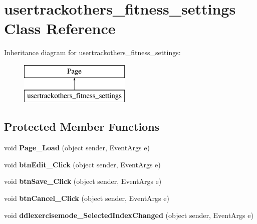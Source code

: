\hypertarget{classusertrackothers__fitness__settings}{\section{usertrackothers\-\_\-fitness\-\_\-settings Class Reference}
\label{classusertrackothers__fitness__settings}
}
Inheritance diagram for usertrackothers\-\_\-fitness\-\_\-settings\-:\begin{figure}[H]
\begin{center}
\leavevmode
\includegraphics[height=2.000000cm]{classusertrackothers__fitness__settings}
\end{center}
\end{figure}
\subsection*{Protected Member Functions}
\begin{DoxyCompactItemize}
\item 
\hypertarget{classusertrackothers__fitness__settings_a963f7387c69b2f320a7dc793b0521196}{void {\bfseries Page\-\_\-\-Load} (object sender, Event\-Args e)}\label{classusertrackothers__fitness__settings_a963f7387c69b2f320a7dc793b0521196}

\item 
\hypertarget{classusertrackothers__fitness__settings_a65551400baa2a6e7719d7042edda7980}{void {\bfseries btn\-Edit\-\_\-\-Click} (object sender, Event\-Args e)}\label{classusertrackothers__fitness__settings_a65551400baa2a6e7719d7042edda7980}

\item 
\hypertarget{classusertrackothers__fitness__settings_a645a0480112fdcf9d2f9a0f713ac9662}{void {\bfseries btn\-Save\-\_\-\-Click} (object sender, Event\-Args e)}\label{classusertrackothers__fitness__settings_a645a0480112fdcf9d2f9a0f713ac9662}

\item 
\hypertarget{classusertrackothers__fitness__settings_aa02e182297ee796593a1877bd26784e3}{void {\bfseries btn\-Cancel\-\_\-\-Click} (object sender, Event\-Args e)}\label{classusertrackothers__fitness__settings_aa02e182297ee796593a1877bd26784e3}

\item 
\hypertarget{classusertrackothers__fitness__settings_a9a79a10e3f9c93c630aac625ef56f49d}{void {\bfseries ddlexercisemode\-\_\-\-Selected\-Index\-Changed} (object sender, Event\-Args e)}\label{classusertrackothers__fitness__settings_a9a79a10e3f9c93c630aac625ef56f49d}

\end{DoxyCompactItemize}


